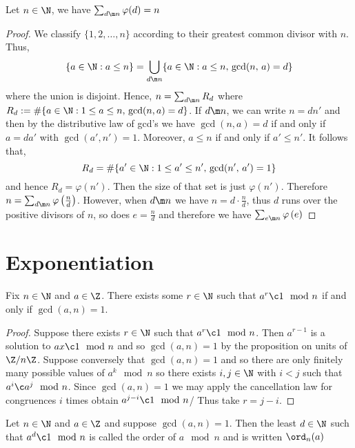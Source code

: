 \begin{nprop}
   Let $n \in \N$, we have $\sum_{d \m n} \varphi(d) = n$
\end{nprop}
\begin{proof}
  We classify $\{1, 2,\dots, n\}$ according to their greatest common divisor with $n$. Thus,
  $$ \{a \in \N : a \le n\} = \bigcup_{d \m n} \{a \in \N : a\le n,\, \gcd(n,\, a) = d\} $$
  where the union is disjoint. Hence, $n = \sum_{d \m n} R_d$ where $R_d := \#\{a \in \N : 1 \le a \le n,\, \gcd(n, a) = d\}$. If $d \m n$, we can write $n = dn'$ and then by the distributive law of gcd's we have $\gcd(n, a) = d$ if and only if $a = da'$ with $\gcd(a', n') = 1$. Moreover, $a \le n$ if and only if $a' \le n'$. It follows that,
  $$ R_d = \#\{a' \in \N: 1 \le a' \le n',\, \gcd(n',\, a') = 1\} $$
  and hence $R_d = \varphi(n')$. Then the size of that set is just $\varphi(n')$. Therefore $n = \sum_{d\m n} \varphi\left(\frac{n}{d}\right)$. However, when $d \m n$ we have $n = d \cdot \frac{n}{d}$, thus $d$ runs over the positive divisors of $n$, so does $e = \frac{n}{d}$ and therefore we have $\sum_{e \m n} \varphi\left( e \right)$
\end{proof}

\section{Exponentiation}

\begin{nprop}
 Fix $n \in \N$ and $a \in \Z$. There exists some $r \in \N$ such that $a^r \c 1 \mod n$ if and only if $\gcd(a, n) = 1$.
\end{nprop}

\begin{proof}
  Suppose there exists $r \in \N$ such that $a^r \c 1 \mod n$. Then $a^{r-1}$ is a solution to $ax \c 1 \mod n$ and so $\gcd(a, n) = 1$ by the proposition on units of $\Z/n\Z$. Suppose conversely that $\gcd(a, n) = 1$ and so there are only finitely many possible values of $a^k \mod n$ so there exists $i, j \in \N$ with $i < j$ such that $a^i \c a^j\mod n$. Since $\gcd(a, n) = 1$ we may apply the cancellation law for congruences $i$ times obtain $a^{j-i}\c 1\mod n$/ Thus take $r = j-i$.
\end{proof}

\begin{ndefi}[Order]
  Let $n \in \N$ and $a \in \Z$ and suppose $\gcd(a, n) = 1$. Then the least $d \in \N$ such that $a^d \c 1 \mod n$ is called the order of $a\mod n$ and is written $\ord_n(a)$
\end{ndefi}

